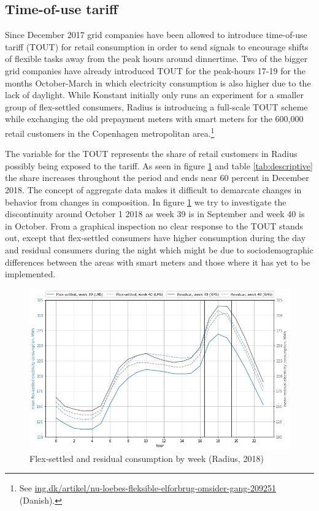 \subsection{Time-of-use tariff}
\label{subsec:d_tout}
Since December 2017 grid companies have been allowed to introduce time-of-use tariff (TOUT) for retail consumption in order to send signals to encourage shifts of flexible tasks away from the peak hours around dinnertime. Two of the bigger grid companies have already introduced TOUT for the peak-hours 17-19 for the months October-March in which electricity consumption is also higher due to the lack of daylight. While Konstant initially only runs an experiment for a smaller group of flex-settled consumers, Radius is introducing a full-scale TOUT scheme while exchanging the old prepayment meters with smart meters for the 600,000 retail customers in the Copenhagen metropolitan area.\footnote{See \href{https://ing.dk/artikel/nu-loebes-fleksible-elforbrug-omsider-gang-209251}{ing.dk/artikel/nu-loebes-fleksible-elforbrug-omsider-gang-209251} (Danish).}\bigskip\par
The variable for the TOUT represents the share of retail customers in Radius possibly being exposed to the tariff. As seen in figure \ref{fig:radius_w39_w40} and table \ref{tab:descriptive} the share increases throughout the period and ends near 60 percent in December 2018. The concept of aggregate data makes it difficult to demarcate changes in behavior from changes in composition. In figure \ref{fig:radius_w39_w40} we try to investigate the discontinuity around October 1 2018 as week 39 is in September and week 40 is in October. From a graphical inspection no clear response to the TOUT stands out, except that flex-settled consumers have higher consumption during the day and residual consumers during the night which might be due to sociodemographic differences between the areas with smart meters and those where it has yet to be implemented.
\begin{figure}[H]
  \centering
  \caption{Flex-settled and residual consumption by week (Radius, 2018)}
  \label{fig:radius_w39_w40}
      \includegraphics[width=1 \textwidth]{03_figures/radius_w39_w40}
\end{figure}

